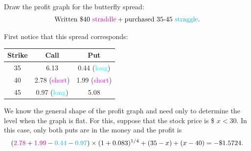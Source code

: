 \begin{frame}[fragile,t]
\begin{myexample}
	Draw the profit graph for the butterfly spread:
	\begin{align*}
		\text{Written \$40 \textcolor{magenta}{straddle}} + \text{purchased 35-45 \textcolor{cyan}{straggle}}.
	\end{align*}
	\pause \bigskip

	\begin{mysol}
		First notice that this spread corresponds:
		\begin{center}
			\renewcommand{\arraystretch}{1.2}
			\begin{tabular}{ccc}
				\hline
				Strike & Call                              & Put                               \\
				\hline
				35     & 6.13                              & 0.44 (\textcolor{cyan}{long})     \\
				40     & 2.78 (\textcolor{magenta}{short}) & 1.99 (\textcolor{magenta}{short}) \\
				45     & 0.97 (\textcolor{cyan}{long})     & 5.08                              \\
			\end{tabular}
		\end{center}
		We know the general shape of the profit graph and need only to determine the level when the graph is flat. For this, suppose that the stock price is \$ $x<30$.
		In this case, only both puts are in the money and the profit is
		\begin{align*}
			(\textcolor{magenta}{2.78}+\textcolor{magenta}{1.99} - \textcolor{cyan}{0.44} -\textcolor{cyan}{0.97}) \times (1+0.083)^{1/4} + (35-x) + (x-40) = -\$1.5724.
		\end{align*}
	\end{mysol}
\end{myexample}
\end{frame}
